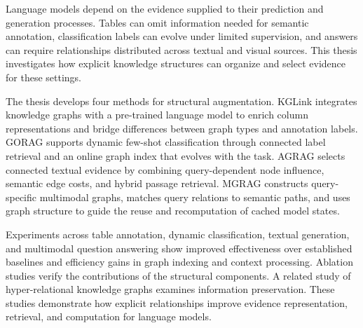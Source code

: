 Language models depend on the evidence supplied to their prediction and generation processes. Tables can omit information needed for semantic annotation, classification labels can evolve under limited supervision, and answers can require relationships distributed across textual and visual sources. This thesis investigates how explicit knowledge structures can organize and select evidence for these settings.

The thesis develops four methods for structural augmentation. KGLink integrates knowledge graphs with a pre-trained language model to enrich column representations and bridge differences between graph types and annotation labels. GORAG supports dynamic few-shot classification through connected label retrieval and an online graph index that evolves with the task. AGRAG selects connected textual evidence by combining query-dependent node influence, semantic edge costs, and hybrid passage retrieval. MGRAG constructs query-specific multimodal graphs, matches query relations to semantic paths, and uses graph structure to guide the reuse and recomputation of cached model states.

Experiments across table annotation, dynamic classification, textual generation, and multimodal question answering show improved effectiveness over established baselines and efficiency gains in graph indexing and context processing. Ablation studies verify the contributions of the structural components. A related study of hyper-relational knowledge graphs examines information preservation. These studies demonstrate how explicit relationships improve evidence representation, retrieval, and computation for language models.
